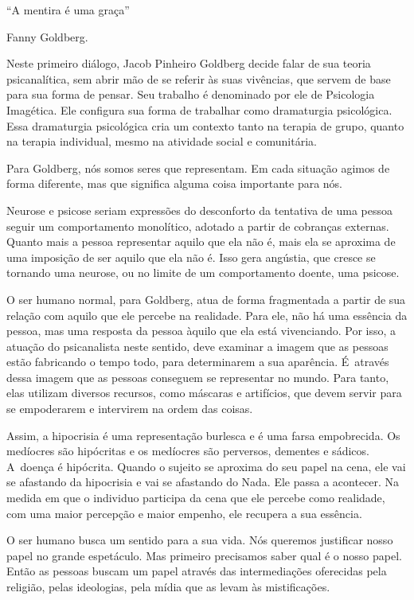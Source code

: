 \newcommand\abrefala{\begingroup\parindent0pt \setlength{\parskip}{6pt plus 3pt}}
\newcommand\fechafala{\endgroup}

 \epigraph{``A mentira é uma graça''}{Fanny Goldberg.} 

 

Neste primeiro diálogo, Jacob Pinheiro Goldberg decide falar de sua
teoria psicanalítica, sem abrir mão de se referir às suas vivências, que
servem de base para sua forma de pensar. Seu trabalho é denominado por
ele de Psicologia Imagética. Ele configura sua forma de trabalhar como
dramaturgia psicológica. Essa dramaturgia psicológica cria um contexto
tanto na terapia de grupo, quanto na terapia individual, mesmo na
atividade social e comunitária.

Para Goldberg, nós somos seres que representam. Em cada situação agimos
de forma diferente, mas que significa alguma coisa importante para nós.

Neurose e psicose seriam expressões do desconforto da tentativa de uma
pessoa seguir um comportamento monolítico, adotado a partir de cobranças
externas. Quanto mais a pessoa representar aquilo que ela não é, mais
ela se aproxima de uma imposição de ser aquilo que ela não é. Isso gera
angústia, que cresce se tornando uma neurose, ou no limite de um
comportamento doente, uma psicose.

O ser humano normal, para Goldberg, atua de forma fragmentada a partir
de sua relação com aquilo que ele percebe na realidade. Para ele, não há
uma essência da pessoa, mas uma resposta da pessoa àquilo que ela está
vivenciando. Por isso, a atuação do psicanalista neste sentido, deve
examinar a imagem que as pessoas estão fabricando o tempo todo, para
determinarem a sua aparência. É~através dessa imagem que as pessoas
conseguem se representar no mundo. Para tanto, elas utilizam diversos
recursos, como máscaras e artifícios, que devem servir para se
empoderarem e intervirem na ordem das coisas.

Assim, a hipocrisia é uma representação burlesca e é uma farsa
empobrecida. Os medíocres são hipócritas e os medíocres são perversos,
dementes e sádicos. A~doença é hipócrita. Quando o sujeito se aproxima
do seu papel na cena, ele vai se afastando da hipocrisia e vai se
afastando do Nada. Ele passa a acontecer. Na medida em que o individuo
participa da cena que ele percebe como realidade, com uma maior
percepção e maior empenho, ele recupera a sua essência.

O ser humano busca um sentido para a sua vida. Nós queremos justificar
nosso papel no grande espetáculo. Mas primeiro precisamos saber qual é o
nosso papel. Então as pessoas buscam um papel através das intermediações
oferecidas pela religião, pelas ideologias, pela mídia que as levam às
mistificações.

